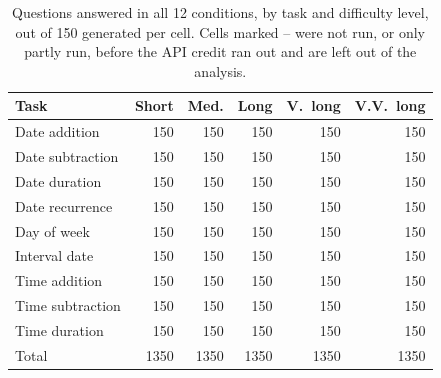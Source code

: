 \begin{table}[t]
\centering
\small
\setlength{\tabcolsep}{3.5pt}
\begin{tabular}{@{}lrrrrr@{}}
\toprule
Task & Short & Med. & Long & V.\ long & V.V.\ long \\
\midrule
Date addition & 150 & 150 & 150 & 150 & 150 \\
Date subtraction & 150 & 150 & 150 & 150 & 150 \\
Date duration & 150 & 150 & 150 & 150 & 150 \\
Date recurrence & 150 & 150 & 150 & 150 & 150 \\
Day of week & 150 & 150 & 150 & 150 & 150 \\
Interval date & 150 & 150 & 150 & 150 & 150 \\
Time addition & 150 & 150 & 150 & 150 & 150 \\
Time subtraction & 150 & 150 & 150 & 150 & 150 \\
Time duration & 150 & 150 & 150 & 150 & 150 \\
\midrule
Total & 1350 & 1350 & 1350 & 1350 & 1350 \\
\bottomrule
\end{tabular}
\caption{Questions answered in all 12 conditions, by task and difficulty level, out of 150 generated per cell. Cells marked -- were not run, or only partly run, before the API credit ran out and are left out of the analysis.}
\label{tab:coverage}
\end{table}
